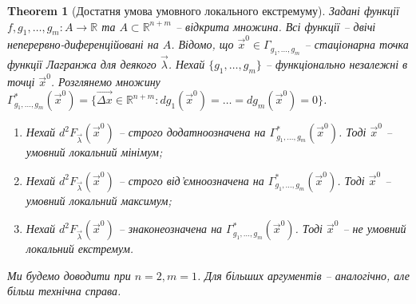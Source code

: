 \documentclass[a4paper, 10pt]{article}
\theoremstyle{theoremdd}
\newtheorem{theorem}{Theorem}[subsection]
\theoremstyle{theoremdd}
\theoremstyle{theoremdd}
\theoremstyle{theoremdd}
\theoremstyle{theoremdd}
\theoremstyle{theoremdd}
\theoremstyle{theoremdd}
\theoremstyle{theoremdd}
\theoremstyle{theoremdd}
\begin{document}
\begin{theorem}[Достатня умова умовного локального екстремуму]
Задані функції $f,g_1,\dots,g_m\colon A \to \mathbb{R}$ та $A \subset \mathbb{R}^{n+m}$ -- відкрита множина. Всі функції -- двічі неперервно-диференційовані на $A$. Відомо, що $\vec{x}^0 \in \Gamma_{g_1,\dots,g_m}$ -- стаціонарна точка функції Лагранжа для деякого $\vec{\lambda}$. Нехай $\{g_1,\dots,g_m\}$ -- функціонально незалежні в точці $\vec{x}^0$. Розглянемо множину $\Gamma^*_{g_1,\dots,g_m}(\vec{x}^0) = \{ \vec{\Delta x} \in \mathbb{R}^{n+m}: dg_1(\vec{x}^0) = \dots = dg_m(\vec{x}^0) = 0 \}$.
\begin{enumerate}[nosep,wide=0pt,label={\arabic*)}]
\item Нехай $d^2 F_{\vec{\lambda}}(\vec{x}^0)$ -- строго додатноозначена на $\Gamma^*_{g_1,\dots,g_m}(\vec{x}^0)$. Тоді $\vec{x}^0$ -- умовний локальний мінімум;
\item Нехай $d^2 F_{\vec{\lambda}}(\vec{x}^0)$ -- строго від'ємноозначена на $\Gamma^*_{g_1,\dots,g_m}(\vec{x}^0)$. Тоді $\vec{x}^0$ -- умовний локальний максимум;
\item Нехай $d^2 F_{\vec{\lambda}}(\vec{x}^0)$ -- знаконеозначена на $\Gamma^*_{g_1,\dots,g_m}(\vec{x}^0)$. Тоді $\vec{x}^0$ -- не умовний локальний екстремум.
\end{enumerate}
\end{theorem}

\textit{Ми будемо доводити при $n = 2, m = 1$. Для більших аргументів -- аналогічно, але більш технічна справа.}
\end{document}
